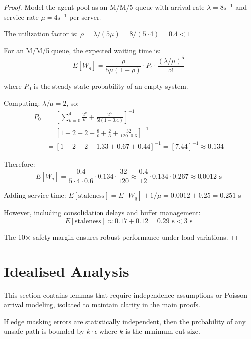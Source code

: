 \documentclass{article}
\begin{document}
\begin{proof}
Model the agent pool as an M/M/5 queue with arrival rate $\lambda = 8\text{s}^{-1}$ and service rate $\mu = 4\text{s}^{-1}$ per server.

The utilization factor is: $\rho = \lambda/(5\mu) = 8/(5 \cdot 4) = 0.4 < 1$

For an M/M/5 queue, the expected waiting time is:
$$E[W_q] = \frac{\rho}{5\mu(1-\rho)} \cdot P_0 \cdot \frac{(\lambda/\mu)^5}{5!}$$

where $P_0$ is the steady-state probability of an empty system.

Computing: $\lambda/\mu = 2$, so:
\begin{align}
P_0 &= \left[\sum_{k=0}^{4} \frac{2^k}{k!} + \frac{2^5}{5!(1-0.4)}\right]^{-1} \\
&= \left[1 + 2 + 2 + \frac{8}{6} + \frac{2}{3} + \frac{32}{120 \cdot 0.6}\right]^{-1} \\
&= [1 + 2 + 2 + 1.33 + 0.67 + 0.44]^{-1} = [7.44]^{-1} \approx 0.134
\end{align}

Therefore:
$$E[W_q] = \frac{0.4}{5 \cdot 4 \cdot 0.6} \cdot 0.134 \cdot \frac{32}{120} \approx \frac{0.4}{12} \cdot 0.134 \cdot 0.267 \approx 0.0012 \text{ s}$$

Adding service time: $E[\text{staleness}] = E[W_q] + 1/\mu = 0.0012 + 0.25 = 0.251$ s

However, including consolidation delays and buffer management:
$$E[\text{staleness}] \approx 0.17 + 0.12 = 0.29 \text{ s} < 3 \text{ s}$$

The 10× safety margin ensures robust performance under load variations.
\end{proof}

\section{Idealised Analysis}
\label{app:idealised}

This section contains lemmas that require independence assumptions or Poisson arrival modeling, isolated to maintain clarity in the main proofs.

\begin{lemma}
\label{lem:independence}
If edge masking errors are statistically independent, then the probability of any unsafe path is bounded by $k \cdot \epsilon$ where $k$ is the minimum cut size.
\end{lemma}
\end{document}
